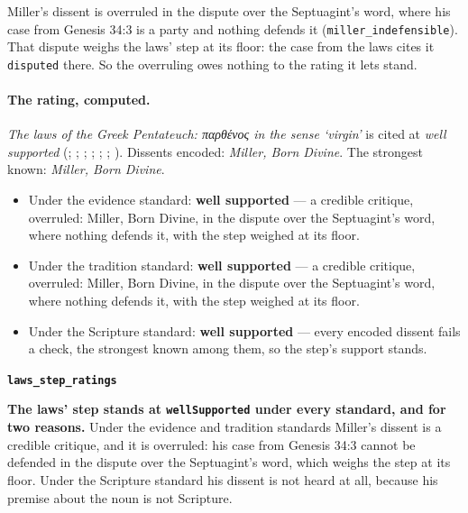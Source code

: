 \documentclass[11pt]{article}
\begin{document}
Miller’s dissent is overruled in the dispute over the Septuagint’s word, where his case from Genesis 34:3 is a party and nothing defends it (\texttt{miller\_\allowbreak{}indefensible}). That dispute weighs the laws’ step at its floor: the case from the laws cites it \texttt{disputed} there. So the overruling owes nothing to the rating it lets stand.

\paragraph{The rating, computed.} \emph{The laws of the Greek Pentateuch: παρθένος in the sense ‘virgin’} is cited at \emph{well supported} (\cite[113]{bratcher-study-of-isaiah-1958}; \cite[102]{bratcher-study-of-isaiah-1958}; \cite[1339]{liddell-scott-jones-lexicon-1940}; \cite[535]{muraoka-lexicon-septuagint-2009}; \cite[s.v. παρθένια]{lust-lexicon-septuagint-2003}; \cite{miller-born-divine-2003}; \cite[67]{rhodea-did-matthew-conceive-2013}). Dissents encoded: \emph{Miller, Born Divine}. The strongest known: \emph{Miller, Born Divine}.
\begin{itemize}
\item Under the evidence standard: \textbf{well supported} --- a credible critique, overruled: Miller, Born Divine, in the dispute over the Septuagint’s word, where nothing defends it, with the step weighed at its floor.
\item Under the tradition standard: \textbf{well supported} --- a credible critique, overruled: Miller, Born Divine, in the dispute over the Septuagint’s word, where nothing defends it, with the step weighed at its floor.
\item Under the Scripture standard: \textbf{well supported} --- every encoded dissent fails a check, the strongest known among them, so the step’s support stands.
\end{itemize}
\par\medskip\noindent\textbf{\texttt{laws\_\allowbreak{}step\_\allowbreak{}ratings}}\par\nobreak\noindent
\textbf{The laws’ step stands at \texttt{well\allowbreak{}Supported} under every standard, and for two reasons.} Under the evidence and tradition standards Miller’s dissent is a credible critique, and it is overruled: his case from Genesis 34:3 cannot be defended in the dispute over the Septuagint’s word, which weighs the step at its floor. Under the Scripture standard his dissent is not heard at all, because his premise about the noun is not Scripture.
\end{document}
